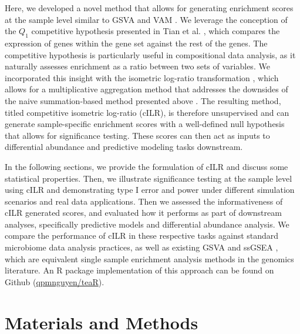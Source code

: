 \documentclass[10pt,letterpaper]{article}
\begin{document}
Here, we developed a novel method that allows for generating enrichment scores at the sample level similar to GSVA \cite{hanzelmann2013} and VAM \cite{frost2020a}. We leverage the conception of the $Q_1$ competitive hypothesis presented in Tian et al. \cite{tian2005}, which compares the expression of genes within the gene set against the rest of the genes. The competitive hypothesis is particularly useful in compositional data analysis, as it naturally assesses enrichment as a ratio between two sets of variables. We incorporated this insight with the isometric log-ratio transformation \cite{egozcue2003}, which allows for a multiplicative aggregation method that addresses the downsides of the naive summation-based method presented above \cite{mclaren2019, silverman2017}. The resulting method, titled competitive isometric log-ratio (cILR), is therefore unsupervised and can generate sample-specific enrichment scores with a well-defined null hypothesis that allows for significance testing. These scores can then act as inputs to differential abundance and predictive modeling tasks downstream. 

In the following sections, we provide the formulation of cILR and discuss some statistical properties. Then, we illustrate significance testing at the sample level using cILR and demonstrating type I error and power under different simulation scenarios and real data applications. Then we assessed the informativeness of cILR generated scores, and evaluated how it performs as part of downstream analyses, specifically predictive models and differential abundance analysis. We compare the performance of cILR in these respective tasks against standard microbiome data analysis practices, as well as existing GSVA \cite{hanzelmann2013} and ssGSEA \cite{barbie2009}, which are equivalent single sample enrichment analysis methods in the genomics literature. An R package implementation of this approach can be found on Github (\href{www.github.com/qpmnguyen/teaR}{qpmnguyen/teaR}).

\section*{Materials and Methods} \label{methods}
\end{document}
